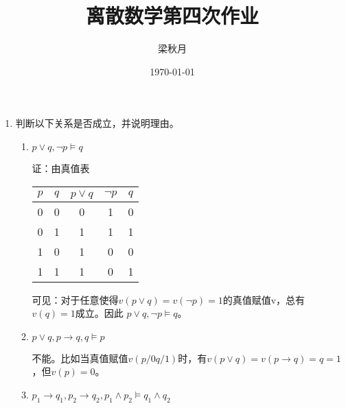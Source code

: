 \documentclass[UTF8]{ctexart}
\title{离散数学第四次作业}
\author{梁秋月}
\date{\today}
\begin{document}
   \maketitle
    \begin{enumerate}
        \item 判断以下关系是否成立，并说明理由。
        \begin{enumerate}
            \item $p \vee  q , \neg p \models  q $
            
            证：由真值表
            \begin{table}[H]
                \centering
                \begin{tabular}{|ccccc|}
                    \hline
                    $p$ & $q$ & $p\vee q$ & $\neg p$ & $q$\\
                    \hline
                    0 & 0 & 0 & 1 & 0\\ 
                    \hline 
                    0 & 1 & 1 & 1 & 1\\ 
                    \hline
                    1 & 0 & 1 & 0 & 0\\
                    \hline
                    1 & 1 & 1 & 0 & 1\\
                    \hline
                \end{tabular}
            \end{table}
            可见：对于任意使得$v(p\vee q) = v(\neg p)=1$的真值赋值v，总有$v(q)=1$成立。因此
            $p \vee  q , \neg p \models  q $。
            \item $p \vee  q , p \rightarrow q, q \models  p $
            
            不能。比如当真值赋值$v(p/0 q/1)$时，有$v(p \vee  q) = v(p \rightarrow q)= q=1$，但$v(p)=0$。

            \item $p_1 \rightarrow q_1 , p_2 \rightarrow q_2 , p_1 \wedge  p_2 \models  q_1 \wedge  q_2 $
            

\end{enumerate}
\end{enumerate}
\end{document}
